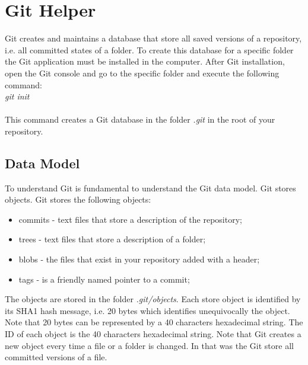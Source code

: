 \chapter{Git Helper}

Git creates and maintains a database that store all saved versions of a repository, i.e. all committed states of a folder.
To create this database for a specific folder the Git application must be installed in the computer.
After Git installation, open the Git console and go to the specific folder and execute the following command:\\

\emph{git init}\\
\\
This command creates a Git database in the folder \emph{.git} in the root of your repository.

\section{Data Model}

To understand Git is fundamental to understand the Git data model. Git stores objects.
Git stores the following objects:

\begin{itemize}
    \item[\textbullet] {commits - text files that store a description of the repository;}
    \item[\textbullet] {trees - text files that store a description of a folder;}
    \item[\textbullet] {blobs - the files that exist in your repository added with a header;}
    \item[\textbullet] {tags - is a friendly named pointer to a commit;}
\end{itemize}

The objects are stored in the folder \emph{.git/objects}. Each store object is identified by its SHA1 hash message, i.e. 20 bytes which identifies unequivocally the object. Note that 20 bytes can be represented by a 40 characters hexadecimal string. The ID of each object is the 40 characters hexadecimal string. Note that Git creates a new object every time a file or a folder is changed. In that was the Git store all committed versions of a file.

